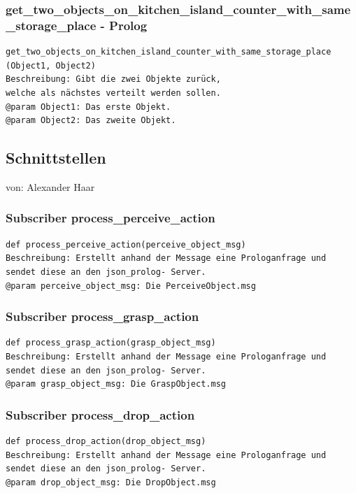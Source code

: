 \documentclass{suturo}
\makeatletter
\newcommand{\chapterauthor}[1]{%
  {\parindent0pt\vspace*{-27pt}%
  \linespread{0}\small\begin{flushright}von: #1\end{flushright}%
  \par\nobreak\vspace*{0pt}}
  \@afterheading%
}
\makeatother
\begin{document}
\subsubsection{get\_two\_objects\_on\_kitchen\_island\_counter\_with\_same\_storage\_place - Prolog}
\begin{verbatim}
get_two_objects_on_kitchen_island_counter_with_same_storage_place
(Object1, Object2)
Beschreibung: Gibt die zwei Objekte zurück, 
welche als nächstes verteilt werden sollen.
@param Object1: Das erste Objekt.
@param Object2: Das zweite Objekt.
\end{verbatim}

\subsection*{Schnittstellen}
\chapterauthor{Alexander Haar}

\subsubsection{Subscriber process\_perceive\_action}
\begin{verbatim}
def process_perceive_action(perceive_object_msg)
Beschreibung: Erstellt anhand der Message eine Prologanfrage und
sendet diese an den json_prolog- Server. 
@param perceive_object_msg: Die PerceiveObject.msg
\end{verbatim}

\subsubsection{Subscriber process\_grasp\_action}
\begin{verbatim}
def process_grasp_action(grasp_object_msg)
Beschreibung: Erstellt anhand der Message eine Prologanfrage und
sendet diese an den json_prolog- Server. 
@param grasp_object_msg: Die GraspObject.msg
\end{verbatim}

\subsubsection{Subscriber process\_drop\_action}
\begin{verbatim}
def process_drop_action(drop_object_msg)
Beschreibung: Erstellt anhand der Message eine Prologanfrage und
sendet diese an den json_prolog- Server. 
@param drop_object_msg: Die DropObject.msg
\end{verbatim}
\end{document}
